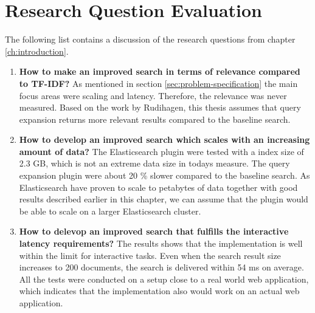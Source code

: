 \section{Research Question Evaluation}
\label{sec:reasearch-questions-evaluation}
The following list contains a discussion of the research questions from chapter \ref{ch:introduction}.

\begin{enumerate}
  \item \textbf{How to make an improved search in terms of relevance compared to TF-IDF?}
  As mentioned in section \ref{sec:problem-specification} the main focus areas were scaling and latency.
  Therefore, the relevance was never measured.
  Based on the work by Rudihagen,
  this thesis assumes that query expansion returns more relevant results compared to the baseline search.

  \item \textbf{How to develop an improved search which scales with an increasing amount of data?}
  The Elasticsearch plugin were tested with a index size of 2.3 GB,
  which is not an extreme data size in todays measure.
  The query expansion plugin were about 20 \% slower compared to the baseline search.
  As Elasticsearch have proven to scale to petabytes of data \cite{elasticsearch-scale} together with good results described earlier in this chapter,
  we can assume that the plugin would be able to scale on a larger Elasticsearch cluster.


  \item \textbf{How to delevop an improved search that fulfills the interactive latency requirements?}
  The results shows that the implementation is well within the limit for interactive tasks.
  Even when the search result size increases to 200 documents,
  the search is delivered within 54 ms on average.
  All the tests were conducted on a setup close to a real world web application,
  which indicates that the implementation also would work on an actual web application.

\end{enumerate}

